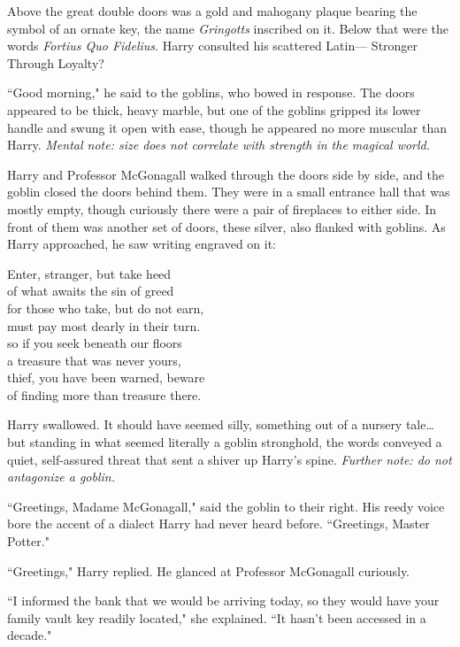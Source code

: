 Above the great double doors was a gold and mahogany
plaque bearing the symbol of an ornate key, the name
\emph{Gringotts} inscribed on it. Below that were the words
\emph{Fortius Quo Fidelius}. Harry consulted his scattered Latin—
Stronger Through Loyalty?

``Good morning," he said to the goblins, who bowed in
response. The doors appeared to be thick, heavy marble,
but one of the goblins gripped its lower handle and swung
it open with ease, though he appeared no more muscular
than Harry. \emph{Mental note: size does not correlate with
strength in the magical world.}

Harry and Professor McGonagall walked through the doors
side by side, and the goblin closed the doors behind them. They
were in a small entrance hall that was mostly empty,
though curiously there were a pair of fireplaces to either
side. In front of them was another set of doors, these
silver, also flanked with goblins. As Harry approached, he
saw writing engraved on it:

\begin{inscription}
Enter, stranger, but take heed\\
of what awaits the sin of greed\\
for those who take, but do not earn,\\
must pay most dearly in their turn.\\
so if you seek beneath our floors\\
a treasure that was never yours,\\
thief, you have been warned, beware\\
of finding more than treasure there.
\end{inscription}

Harry swallowed. It should have seemed silly, something
out of a nursery tale{\ldots} but standing in what seemed
literally a goblin stronghold, the words conveyed a quiet,
self-assured threat that sent a shiver up Harry's spine.
\emph{Further note: do not antagonize a goblin.}

``Greetings, Madame McGonagall," said the goblin to their
right. His reedy voice bore the accent of a dialect
Harry had never heard before. ``Greetings, Master Potter."

``Greetings," Harry replied. He glanced at Professor McGonagall curiously.

``I informed the bank that we would be arriving today, so
they would have your family vault key readily located," she
explained. ``It hasn't been accessed in a decade."


